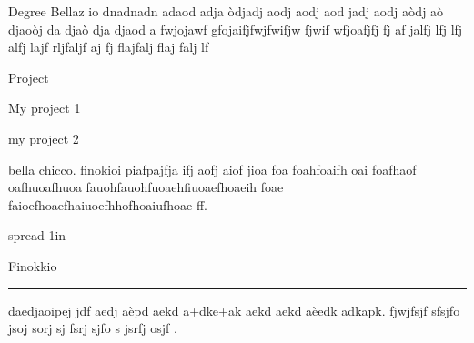 \documentclass[a4paper,12pt]{dmCV}
\begin{document}
\address{Via Prenestina 226}
\personaldata
\begin{eventlist}{Degree}
  Bellaz io dnadnadn adaod adja òdjadj aodj aodj aod
   jadj aodj aòdj aò djaoòj da djaò dja djaod a
  fwjojawf gfojaifjfwjfwifjw fjwif wfjoafjfj fj af jalfj
    lfj lfj alfj lajf rljfaljf aj fj flajfalj flaj falj lf
\end{eventlist}

\begin{eventlist}{Project}
  \item My project 1
  \item my project 2
\end{eventlist}

 bella chicco. finokioi piafpajfja ifj aofj aiof jioa foa foahfoaifh
 oai foafhaof oafhuoafhuoa fauohfauohfuoaehfiuoaefhoaeih foae
 faioefhoaefhaiuoefhhofhoaiufhoae ff.\par
\hbox spread 1in{Finokkio  \leaders\hrule  height1.5pt\hfil}
daedjaoipej jdf aedj aèpd aekd a+dke+ak aekd aekd aèedk
adkapk. fjwjfsjf sfsjfo jsoj sorj sj fsrj sjfo s jsrfj osjf .
\end{document}
